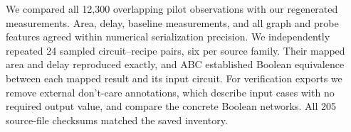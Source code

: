We compared all 12,300 overlapping pilot observations with our regenerated measurements. Area, delay, baseline measurements, and all graph and probe features agreed within numerical serialization precision. We independently repeated 24 sampled circuit--recipe pairs, six per source family. Their mapped area and delay reproduced exactly, and ABC established Boolean equivalence between each mapped result and its input circuit. For verification exports we remove external don't-care annotations, which describe input cases with no required output value, and compare the concrete Boolean networks. All 205 source-file checksums matched the saved inventory.
